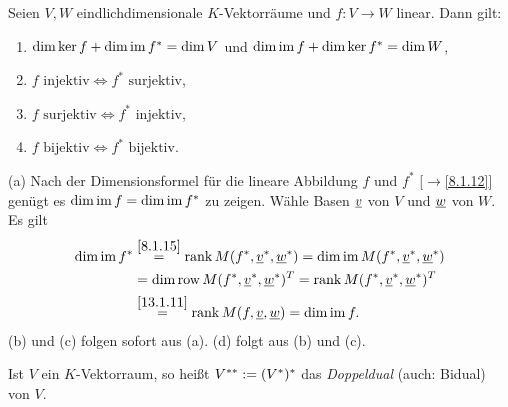 \documentclass[../../main.tex]{subfiles}
\begin{document}
\begin{pro}\label{13.1.12}
Seien $V,W$ eindlichdimensionale $K$-Vektorräume und $f: V\to W$ linear. Dann gilt:	
\begin{enumerate}[\normalfont(a)]
\item $\dim \ker f+\dim \operatorname{im} f^*=\dim V$ und $\dim \operatorname{im} f+\dim\ker f^*=\dim W$,
\item $f\text{ injektiv}\Longleftrightarrow f^*\text{ surjektiv}$,
\item $f\text{ surjektiv}\Longleftrightarrow f^*\text{ injektiv}$,
\item $f\text{ bijektiv}\Longleftrightarrow f^*\text{ bijektiv}$.
\end{enumerate}
\end{pro}
\begin{cproof}
(a) Nach der Dimensionsformel für die lineare Abbildung $f$ und $f^*$ [$\to$\ref{8.1.12}] genügt es $\dim \operatorname{im} f=\dim \operatorname{im} f^*$ zu zeigen. Wähle Basen ${\underline v}$ von $V$ und ${\underline w}$ von $W$. Es gilt 
\begin{align*}
\dim \operatorname{im} f^* &\stackrel{\ref{8.1.15}}{=}\operatorname{rank} M(f^*,\underline{v}^*,\underline{w}^*)=\dim\operatorname{im} M(f^*,\underline{v}^*,\underline{w}^*)\\
&=\dim\operatorname{row} M(f^*,\underline{v}^*,\underline{w}^*)^T=\operatorname{rank} M(f^*,\underline{v}^*,\underline{w}^*)^T\\
&\stackrel{\ref{13.1.11}}{=}\operatorname{rank} M(f,\underline{v},\underline{w})=\dim\operatorname{im} f.
\end{align*}
(b) und (c) folgen sofort aus (a). (d) folgt aus (b) und (c).
\end{cproof}

\begin{df}\label{13.1.13}
Ist $V$ ein $K$-Vektorraum, so heißt $V^{**}:=(V^*)^*$ das \emph{Doppeldual} (auch: Bidual) von $V$.
\end{df}
\end{document}
